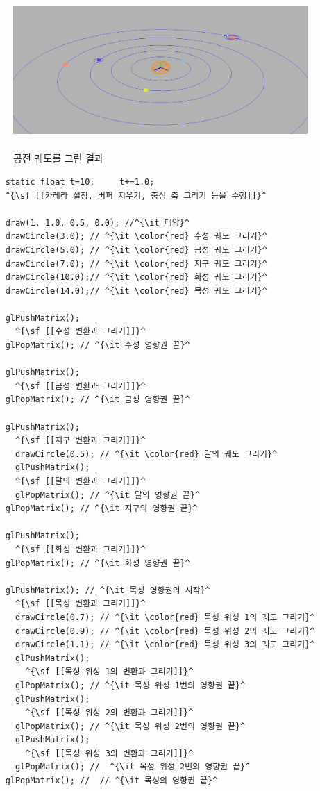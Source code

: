 \begin{figure}[h!]
  \centering
    \includegraphics[height=6cm]{OGL_transform/solar2.png}
    \caption{공전 궤도를 그린 결과}
    \label{fig:OGL_transform:solar2}
\end{figure}


\begin{algorithmbis}\label{code:OGL_transform:soloarSystem2}
\lstset{language=C++,escapechar=^} 
\begin{lstlisting}
    static float t=10;     t+=1.0;
    ^{\sf [[카레라 설정, 버퍼 지우기, 중심 축 그리기 등을 수행]]}^
    
    draw(1, 1.0, 0.5, 0.0); //^{\it 태양}^
    drawCircle(3.0); // ^{\it \color{red} 수성 궤도 그리기}^
    drawCircle(5.0); // ^{\it \color{red} 금성 궤도 그리기}^
    drawCircle(7.0); // ^{\it \color{red} 지구 궤도 그리기}^
    drawCircle(10.0);// ^{\it \color{red} 화성 궤도 그리기}^
    drawCircle(14.0);// ^{\it \color{red} 목성 궤도 그리기}^
    
    glPushMatrix();
      ^{\sf [[수성 변환과 그리기]]}^
    glPopMatrix(); // ^{\it 수성 영향권 끝}^
    
    glPushMatrix();
      ^{\sf [[금성 변환과 그리기]]}^
    glPopMatrix(); // ^{\it 금성 영향권 끝}^
    
    glPushMatrix();
      ^{\sf [[지구 변환과 그리기]]}^
      drawCircle(0.5); // ^{\it \color{red} 달의 궤도 그리기}^
      glPushMatrix();
      ^{\sf [[달의 변환과 그리기]]}^
      glPopMatrix(); // ^{\it 달의 영향권 끝}^
    glPopMatrix(); // ^{\it 지구의 영향권 끝}^
    
    glPushMatrix();
      ^{\sf [[화성 변환과 그리기]]}^
    glPopMatrix(); // ^{\it 화성 영향권 끝}^
    
    glPushMatrix(); // ^{\it 목성 영향권의 시작}^
      ^{\sf [[목성 변환과 그리기]]}^
      drawCircle(0.7); // ^{\it \color{red} 목성 위성 1의 궤도 그리기}^
      drawCircle(0.9); // ^{\it \color{red} 목성 위성 2의 궤도 그리기}^
      drawCircle(1.1); // ^{\it \color{red} 목성 위성 3의 궤도 그리기}^
      glPushMatrix();
        ^{\sf [[목성 위성 1의 변환과 그리기]]}^
      glPopMatrix(); // ^{\it 목성 위성 1번의 영향권 끝}^
      glPushMatrix();
        ^{\sf [[목성 위성 2의 변환과 그리기]]}^
      glPopMatrix(); // ^{\it 목성 위성 2번의 영향권 끝}^
      glPushMatrix();
        ^{\sf [[목성 위성 3의 변환과 그리기]]}^
      glPopMatrix(); //  ^{\it 목성 위성 2번의 영향권 끝}^
    glPopMatrix(); //  // ^{\it 목성의 영향권 끝}^
\end{lstlisting}
\end{algorithmbis}

